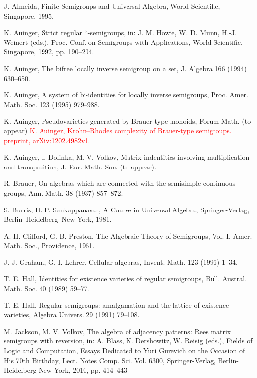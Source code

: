 \documentclass[preprint,1p,times]{elsarticle}
\numberwithin{equation}{section}
\theoremstyle{remark}
\def\red#1{\textcolor{red}{#1}}
\begin{document}
\begin{thebibliography}{99}
\frenchspacing

J. Almeida, Finite Semigroups and Universal Algebra, World Scientific, Singapore, 1995.

K. Auinger, Strict regular $*$-semigroups, in: J. M. Howie, W. D. Munn, H.-J. Weinert (eds.), Proc. Conf. on Semigroups
with Applications, World Scientific, Singapore, 1992, pp. 190--204.

K. Auinger, The bifree locally inverse semigroup on a set, J. Algebra 166 (1994) 630--650.

K. Auinger, A system of bi-identities for locally inverse semigroups, Proc. Amer. Math. Soc. 123 (1995) 979--988.

K. Auinger, Pseudovarieties generated by Brauer-type monoids, Forum Math. (to appear)
\red{
K. Auinger, Krohn--Rhodes complexity of Brauer-type semigroups. preprint, arXiv:1202.4982v1.}

K. Auinger, I. Dolinka, M. V. Volkov, Matrix indentities involving multiplication and transposition, J. Eur. Math. Soc.
(to appear).

R. Brauer, On algebras which are connected with the semisimple continuous groups, Ann. Math. 38 (1937) 857--872.

S. Burris, H. P. Sankappanavar, A Course in Universal Algebra, Springer-Verlag, Berlin--Heidelberg--New York, 1981.

A. H. Clifford, G. B. Preston, The Algebraic Theory of Semigroups, Vol. I, Amer. Math. Soc., Providence, 1961.


J. J. Graham, G. I. Lehrer, Cellular algebras, Invent. Math. 123 (1996) 1--34.

T. E. Hall, Identities for existence varieties of regular semigroups, Bull. Austral. Math. Soc. 40 (1989) 59--77.

T. E. Hall, Regular semigroups: amalgamation and the lattice of existence varieties, Algebra Univers. 29 (1991)
79--108.

M. Jackson, M. V. Volkov, The algebra of adjacency patterns: Rees matrix semigroups with reversion, in: A. Blass, N.
Dershowitz, W. Reisig (eds.), Fields of Logic and Computation, Essays Dedicated to Yuri Gurevich on the Occasion of His
70th Birthday, Lect. Notes Comp. Sci. Vol. 6300, Springer-Verlag, Berlin-Heidelberg-New York, 2010, pp. 414--443.


\end{thebibliography}
\end{document}
